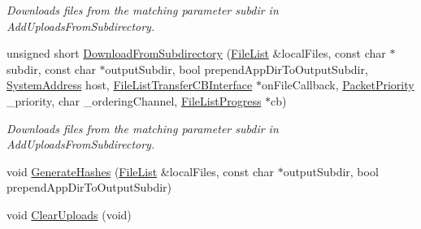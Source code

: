 \begin{DoxyCompactItemize}
\begin{DoxyCompactList}\small\item\em Downloads files from the matching parameter {\itshape subdir} in Add\-Uploads\-From\-Subdirectory. \end{DoxyCompactList}\item 
unsigned short \hyperlink{class_rak_net_1_1_directory_delta_transfer_a4f31a3a50da3d8a8ee271cc96a1f05b6}{Download\-From\-Subdirectory} (\hyperlink{class_rak_net_1_1_file_list}{File\-List} \&local\-Files, const char $\ast$subdir, const char $\ast$output\-Subdir, bool prepend\-App\-Dir\-To\-Output\-Subdir, \hyperlink{struct_rak_net_1_1_system_address}{System\-Address} host, \hyperlink{class_rak_net_1_1_file_list_transfer_c_b_interface}{File\-List\-Transfer\-C\-B\-Interface} $\ast$on\-File\-Callback, \hyperlink{_packet_priority_8h_a659378374e516180f93640c79f59705c}{Packet\-Priority} \-\_\-priority, char \-\_\-ordering\-Channel, \hyperlink{class_rak_net_1_1_file_list_progress}{File\-List\-Progress} $\ast$cb)
\begin{DoxyCompactList}\small\item\em Downloads files from the matching parameter {\itshape subdir} in Add\-Uploads\-From\-Subdirectory. \end{DoxyCompactList}\item 
void \hyperlink{class_rak_net_1_1_directory_delta_transfer_a001e93bd84980e3076f3a9841924706e}{Generate\-Hashes} (\hyperlink{class_rak_net_1_1_file_list}{File\-List} \&local\-Files, const char $\ast$output\-Subdir, bool prepend\-App\-Dir\-To\-Output\-Subdir)
\item 
\hypertarget{class_rak_net_1_1_directory_delta_transfer_a522b0568414be697ea6b6e41474aeab7}{void \hyperlink{class_rak_net_1_1_directory_delta_transfer_a522b0568414be697ea6b6e41474aeab7}{Clear\-Uploads} (void)}\label{class_rak_net_1_1_directory_delta_transfer_a522b0568414be697ea6b6e41474aeab7}


\end{DoxyCompactItemize}
